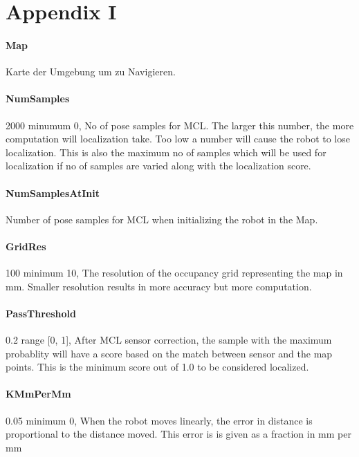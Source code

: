 \documentclass{article}
\begin{document}
\appendix
\section{Appendix I}

\paragraph{Map}          Karte der Umgebung um zu Navigieren. 

\paragraph{NumSamples} 2000           minumum 0,  No of pose samples for MCL. The larger
                          this number, the more computation will localization
                          take. Too low a number will cause the robot to lose
                          localization. This is also the maximum no of samples
                          which will be used for localization if no of samples
                          are varied along with the localization score.
\paragraph{NumSamplesAtInit} Number of pose samples for MCL when initializing the robot in the Map.
\paragraph{GridRes} 100               minimum 10,  The resolution of the occupancy grid
                          representing the map in mm. Smaller resolution
                          results in more accuracy but more computation.

\paragraph{PassThreshold} 0.2         range [0, 1],  After MCL sensor correction, the
                          sample with the maximum probablity will have a score
                          based on the match between sensor and the map
                          points. This is the minimum score out of 1.0 to be
                          considered localized.

\paragraph{KMmPerMm} 0.05             minimum 0,  When the robot moves linearly, the error
                          in distance is proportional to the distance moved.
                          This error is is given as a fraction in mm per mm
\end{document}
